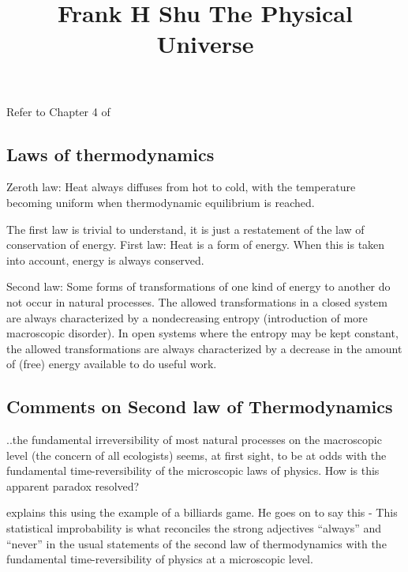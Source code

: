 \documentclass{../template/texnote}
\title{Frank H Shu The Physical Universe}
\begin{document}
    \maketitle {}

\section{}
Refer to Chapter 4 of 
\subsection{Laws of thermodynamics}

Zeroth law: Heat always diffuses from hot to cold, with the temperature becoming uniform when thermodynamic equilibrium is reached.

The first law is trivial to understand, it is just a restatement of the law of conservation of energy.
First law: Heat is a form of energy. When this is taken into account, energy is always conserved.

Second law: Some forms of transformations of one kind of energy to another do not occur in natural processes.
The allowed transformations in a closed system are always characterized by a nondecreasing entropy (introduction of more macroscopic disorder).
In open systems where the entropy may be kept constant, the allowed transformations are always characterized by a decrease in the amount of (free) energy available to do useful work.

\subsection{Comments on Second law of Thermodynamics}

..the fundamental irreversibility of most natural processes on the macroscopic level (the concern of all ecologists) seems, at first sight, to be at odds with the fundamental time-reversibility of the microscopic laws of physics. How is this apparent paradox resolved?

\citeauthor{shu_physical_1982} explains this using the example of a billiards game.
He goes on to say this - 
This statistical improbability is what reconciles the strong adjectives ``always'' and ``never'' in the usual statements of the second law of thermodynamics with the fundamental time-reversibility of physics at a microscopic level.

    \printbibliography
\end{document}
